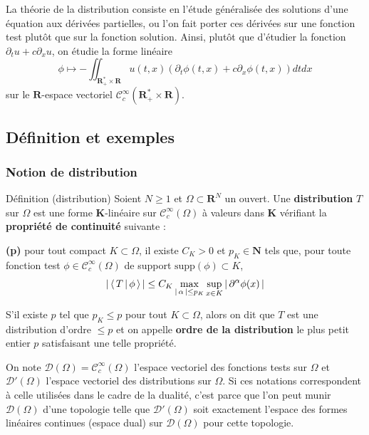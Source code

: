         La théorie de la distribution consiste en l’étude généralisée des solutions d’une équation aux dérivées partielles, ou l’on fait porter ces dérivées sur une fonction test plutôt que sur la fonction solution. Ainsi, plutôt que d’étudier la fonction $\partial_t u + c \partial_x u$, on étudie la forme linéaire 
        \[ \phi \longmapsto - \iint_{\mathbf{R}_+^* \times \mathbf{R}} u(t,x)(\partial_t \phi(t,x) + c \partial_x \phi(t,x)) dt dx \]
        sur le $\mathbf{R}$-espace vectoriel $\mathcal{C}_c^{\infty}(\mathbf{R}_+^* \times \mathbf{R})$.

    \subsection{Définition et exemples}

        \subsubsection{Notion de distribution}

        \begin{omed}{Définition (distribution)}
            Soient $N \geq 1$ et $\Omega \subset \mathbf{R}^N$ un ouvert. Une \textbf{distribution} $T$ sur $\Omega$ est une forme $\mathbf{K}$-linéaire sur $\mathcal{C}_c^{\infty}(\Omega)$ à valeurs dans $\mathbf{K}$ vérifiant la \textbf{propriété de continuité} suivante : 
            
            \textbf{(p)} pour tout compact $K \subset \Omega$, il existe $C_K > 0$ et $p_{K} \in \mathbf{N}$ tels que, pour toute fonction test $\phi \in \mathcal{C}_c^{\infty}(\Omega)$ de support $\text{supp}(\phi) \subset K$, 
            \[ \left\lvert \, \left< \, T \, \middle| \, \phi \, \right> \, \right\rvert \leq C_K \max_{\left\lvert \, \alpha \, \right\rvert \leq p_K} \sup_{x \in K} \left\lvert \, \partial^{\alpha} \phi(x) \, \right\rvert \]   

            S’il existe $p$ tel que $p_K \leq p$ pour tout $K \subset \Omega$, alors on dit que $T$ est une distribution d’ordre $\leq p$ et on appelle \textbf{ordre de la distribution} le plus petit entier $p$ satisfaisant une telle propriété.
        \end{omed}

        On note $\mathcal{D}(\Omega) = \mathcal{C}^{\infty}_c(\Omega)$ l’espace vectoriel des fonctions tests sur $\Omega$ et $\mathcal{D}'(\Omega)$ l’espace vectoriel des distributions sur $\Omega$. Si ces notations correspondent à celle utilisées dans le cadre de la dualité, c’est parce que l’on peut munir $\mathcal{D}(\Omega)$ d’une topologie telle que $\mathcal{D}'(\Omega)$ soit exactement l’espace des formes linéaires continues (espace dual) sur $\mathcal{D}(\Omega)$ pour cette topologie. 

